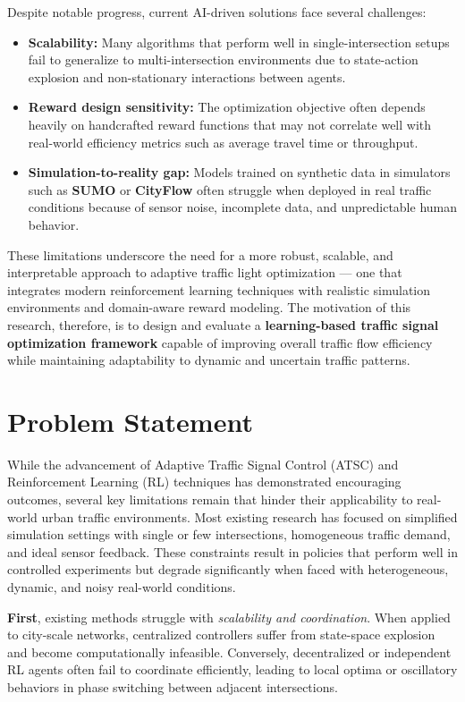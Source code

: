 \documentclass[12pt]{report} %
\begin{document}
Despite notable progress, current AI-driven solutions face several challenges:
\begin{itemize}
    \item \textbf{Scalability:} Many algorithms that perform well in single-intersection setups fail to generalize to multi-intersection environments due to state-action explosion and non-stationary interactions between agents.
    \item \textbf{Reward design sensitivity:} The optimization objective often depends heavily on handcrafted reward functions that may not correlate well with real-world efficiency metrics such as average travel time or throughput.
    \item \textbf{Simulation-to-reality gap:} Models trained on synthetic data in simulators such as \textbf{SUMO} or \textbf{CityFlow} often struggle when deployed in real traffic conditions because of sensor noise, incomplete data, and unpredictable human behavior.
\end{itemize}

These limitations underscore the need for a more robust, scalable, and interpretable approach to adaptive traffic light optimization --- one that integrates modern reinforcement learning techniques with realistic simulation environments and domain-aware reward modeling. The motivation of this research, therefore, is to design and evaluate a \textbf{learning-based traffic signal optimization framework} capable of improving overall traffic flow efficiency while maintaining adaptability to dynamic and uncertain traffic patterns.

\section{Problem Statement}

While the advancement of Adaptive Traffic Signal Control (ATSC) and Reinforcement Learning (RL) techniques has demonstrated encouraging outcomes, several key limitations remain that hinder their applicability to real-world urban traffic environments. Most existing research has focused on simplified simulation settings with single or few intersections, homogeneous traffic demand, and ideal sensor feedback. These constraints result in policies that perform well in controlled experiments but degrade significantly when faced with heterogeneous, dynamic, and noisy real-world conditions.

\textbf{First}, existing methods struggle with \textit{scalability and coordination}. When applied to city-scale networks, centralized controllers suffer from state-space explosion and become computationally infeasible. Conversely, decentralized or independent RL agents often fail to coordinate efficiently, leading to local optima or oscillatory behaviors in phase switching between adjacent intersections.
\end{document}
